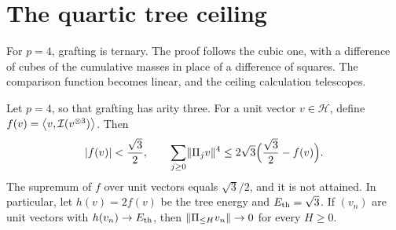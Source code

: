 \section{The quartic tree ceiling}\label{sec:tree-quartic-ceiling}

For $p=4$, grafting is ternary. The proof follows the cubic one, with a difference of cubes of the cumulative masses in place of a difference of squares. The comparison function becomes linear, and the ceiling calculation telescopes.

\begin{lemma}
\label{thm:geometry-quartic-tree-ceiling}
Let $p=4$, so that grafting has arity three. For a unit vector $v\in\mathcal H$, define $f(v)=\left\langle v,\mathcal I(v^{\otimes3})\right\rangle$. Then
\begin{equation}\label{eq:tree-quartic-ceiling}
 |f(v)|<\frac{\sqrt3}{2},\qquad
 \sum_{j\ge0}\lVert\Pi_jv\rVert^4\le2\sqrt3\Bigl(\frac{\sqrt3}{2}-f(v)\Bigr).
\end{equation}
The supremum of $f$ over unit vectors equals $\sqrt3/2$, and it is not attained. In particular, let $h(v)=2f(v)$ be the tree energy and $E_{\mathrm{th}}=\sqrt3$. If $(v_n)$ are unit vectors with $h(v_n)\to E_{\mathrm{th}}$, then $\lVert\Pi_{\le H}v_n\rVert\to0$ for every $H\ge0$.
\end{lemma}

